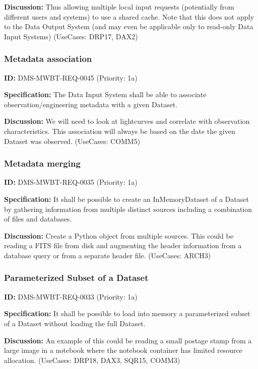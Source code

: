 \documentclass[SE,toc,lsstdraft]{lsstdoc}
\begin{document}
\textbf{Discussion:}
Thus allowing multiple local input requests (potentially from different users and systems) to use a shared cache. Note that this does not apply to the Data Output System (and may even be applicable only to read-only Data Input Systems) (UseCases: DRP17, DAX2)

\subsubsection{Metadata association}

\label{DMS-MWBT-REQ-0045}
\textbf{ID:} DMS-MWBT-REQ-0045 (Priority: 1a)

\textbf{Specification:}
The Data Input System shall be able to associate observation/engineering metadata with a given Dataset.

\textbf{Discussion:}
We will need to look at lightcurves and correlate with observation characteristics. This association will always be based on the date the given Dataset was observed. (UseCases: COMM5)

\subsubsection{Metadata merging}

\label{DMS-MWBT-REQ-0035}
\textbf{ID:} DMS-MWBT-REQ-0035 (Priority: 1a)

\textbf{Specification:}
It shall be possible to create an InMemoryDataset of a Dataset by gathering information from multiple distinct sources including a combination of files and databases.

\textbf{Discussion:}
Create a Python object from multiple sources. This could be reading a FITS file from disk and augmenting the header information from a database query or from a separate header file. (UseCases: ARCH3)

\subsubsection{Parameterized Subset of a Dataset}

\label{DMS-MWBT-REQ-0033}
\textbf{ID:} DMS-MWBT-REQ-0033 (Priority: 1a)

\textbf{Specification:}
It shall be possible to load into memory a parameterized subset of a Dataset without loading the full Dataset.

\textbf{Discussion:}
An example of this could be reading a small postage stamp from a large image in a notebook where the notebook container has limited resource allocation. (UseCases: DRP18, DAX3, SQR15, COMM3)
\end{document}
